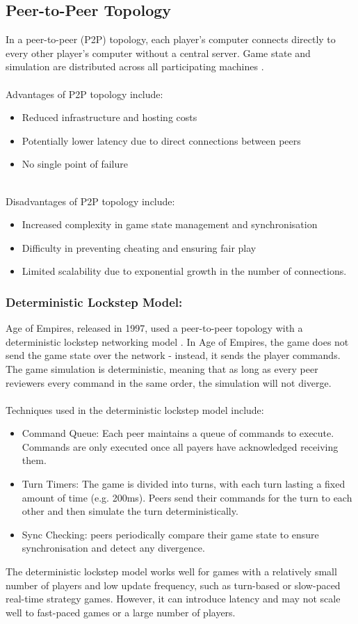 \subsection{Peer-to-Peer Topology}
In a peer-to-peer (P2P) topology, each player's computer connects directly to every other player's computer without a central server. Game state and simulation are distributed across all participating machines \cite{multiplayer-networking}.
\\
\noindent
\\
Advantages of P2P topology include:
\begin{itemize}
    \item Reduced infrastructure and hosting costs
    \item Potentially lower latency due to direct connections between peers
    \item No single point of failure
\end{itemize}
\noindent
\\
Disadvantages of P2P topology include:
\begin{itemize}
    \item Increased complexity in game state management and synchronisation
    \item Difficulty in preventing cheating and ensuring fair play
    \item Limited scalability due to exponential growth in the number of connections.
\end{itemize}
\noindent
\subsubsection{Deterministic Lockstep Model:}
Age of Empires, released in 1997, used a peer-to-peer topology with a deterministic lockstep networking model \cite{bettner20011500}. In Age of Empires, the game does not send the game state over the network - instead, it sends the player commands. The game simulation is deterministic, meaning that as long as every peer reviewers every command in the same order, the simulation will not diverge.
\\
\noindent
\\
Techniques used in the deterministic lockstep model include:
\begin{itemize}
    \item Command Queue: Each peer maintains a queue of commands to execute. Commands are only executed once all payers have acknowledged receiving them.
    \item Turn Timers: The game is divided into turns, with each turn lasting a fixed amount of time (e.g. 200ms). Peers send their commands for the turn to each other and then simulate the turn deterministically.
    \item Sync Checking: peers periodically compare their game state to ensure synchronisation and detect any divergence.
\end{itemize}
The deterministic lockstep model works well for games with a relatively small number of players and low update frequency, such as turn-based or slow-paced real-time strategy games. However, it can introduce latency and may not scale well to fast-paced games or a large number of players.

